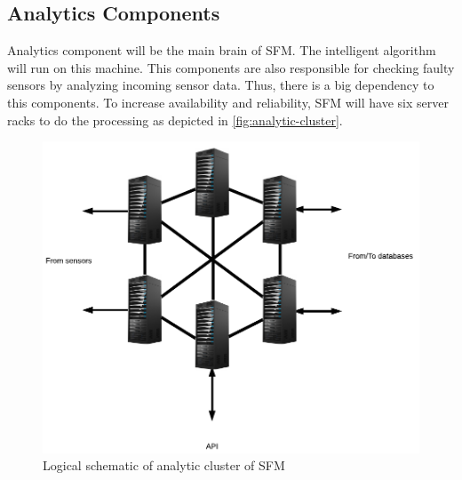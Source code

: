 



\subsection{Analytics Components}
\label{subsec:analytics}
Analytics component will be the main brain of SFM. The intelligent algorithm will run on this machine. This components are also responsible for checking faulty sensors by analyzing incoming sensor data. Thus, there is a big dependency to this components. To increase availability and reliability, SFM will have six server racks to do the processing as depicted in \autoref{fig:analytic-cluster}.

\begin{figure}[hb!]
\centering
\includegraphics[]{6-hardware/images/analytic-cluster.png}
\caption{Logical schematic of analytic cluster of SFM}
\label{fig:analytic-cluster}
\end{figure}

